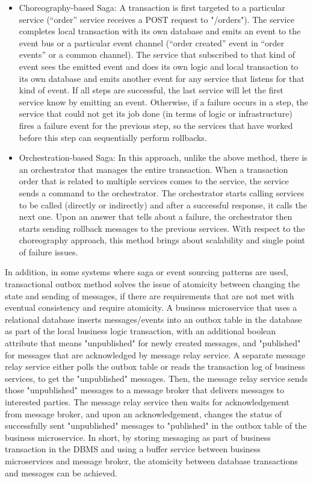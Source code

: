 \documentclass{Configuration_Files/PoliMi3i_thesis}
\begin{document}
\begin{itemize}
    \item Choreography-based Saga: A transaction is first targeted to a particular service (“order” service receives a POST request to "/orders").
    The service completes local transaction with its own database and emits an event to the event bus or a particular event channel (“order created” event in “order events” or a common channel).
    The service that subscribed to that kind of event sees the emitted event and does its own logic and local transaction to its own database and emits another event for any service that listens for that kind of event.
    If all steps are successful, the last service will let the first service know by emitting an event.
    Otherwise, if a failure occurs in a step, the service that could not get its job done (in terms of logic or infrastructure) fires a failure event for the previous step, so the services that have worked before this step can sequentially perform rollbacks.
    
    \item Orchestration-based Saga: In this approach, unlike the above method, there is an orchestrator that manages the entire transaction.
    When a transaction order that is related to multiple services comes to the service, the service sends a command to the orchestrator.
    The orchestrator starts calling services to be called (directly or indirectly) and after a successful response, it calls the next one. Upon an answer that tells about a failure, the orchestrator then starts sending rollback messages to the previous services.
    With respect to the choreography approach, this method brings about scalability and single point of failure issues.
\end{itemize}

In addition, in some systems where saga or event sourcing patterns are used, transactional outbox method solves the issue of atomicity between changing the state and sending of messages, if there are requirements that are not met with eventual consistency and require atomicity.
A business microservice that uses a relational database inserts messages/events into an outbox table in the database as part of the local business logic transaction, with an additional boolean attribute that means "unpublished" for newly created messages, and "published" for messages that are acknowledged by message relay service.
A separate message relay service either polls the outbox table or reads the transaction log of business services, to get the "unpublished" messages.
Then, the message relay service sends those "unpublished" messages to a message broker that delivers messages to interested parties.
The message relay service then waits for acknowledgement from message broker, and upon an acknowledgement, changes the status of successfully sent "unpublished" messages to "published" in the outbox table of the business microservice.
In short, by storing messaging as part of business transaction in the DBMS and using a buffer service between business microservices and message broker, the atomicity between database transactions and messages can be achieved.
\end{document}
